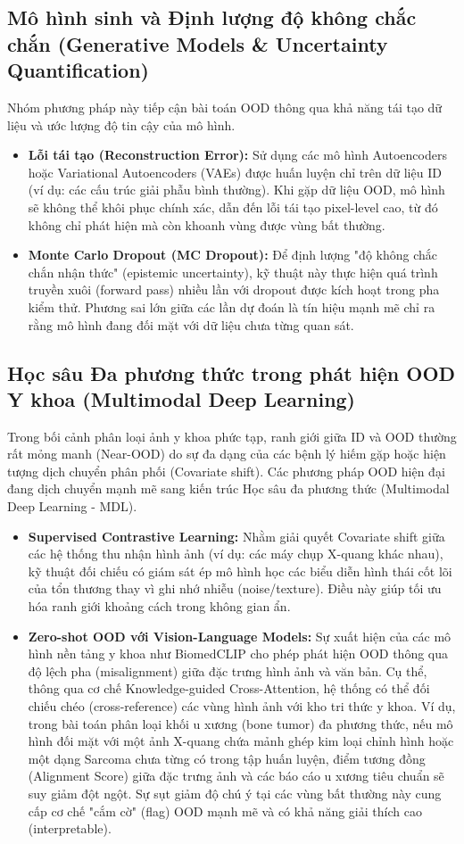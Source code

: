 \subsection{Mô hình sinh và Định lượng độ không chắc chắn (Generative Models \& Uncertainty Quantification)}
Nhóm phương pháp này tiếp cận bài toán OOD thông qua khả năng tái tạo dữ liệu và ước lượng độ tin cậy của mô hình.
\begin{itemize}
  \item \textbf{Lỗi tái tạo (Reconstruction Error):} Sử dụng các mô hình Autoencoders hoặc Variational Autoencoders (VAEs) 
  được huấn luyện chỉ trên dữ liệu ID (ví dụ: các cấu trúc giải phẫu bình thường). 
  Khi gặp dữ liệu OOD, mô hình sẽ không thể khôi phục chính xác, dẫn đến lỗi tái tạo pixel-level cao, 
  từ đó không chỉ phát hiện mà còn khoanh vùng được vùng bất thường.\item \textbf{Monte Carlo Dropout (MC Dropout):} 
  Để định lượng "độ không chắc chắn nhận thức" (epistemic uncertainty), kỹ thuật này thực hiện quá trình truyền xuôi (forward pass) 
  nhiều lần với dropout được kích hoạt trong pha kiểm thử. Phương sai lớn giữa các lần dự đoán là tín hiệu mạnh mẽ chỉ ra rằng mô 
  hình đang đối mặt với dữ liệu chưa từng quan sát.
\end{itemize}

\subsection{Học sâu Đa phương thức trong phát hiện OOD Y khoa (Multimodal Deep Learning)}
Trong bối cảnh phân loại ảnh y khoa phức tạp, ranh giới giữa ID và OOD thường rất mỏng manh (Near-OOD) 
do sự đa dạng của các bệnh lý hiếm gặp hoặc hiện tượng dịch chuyển phân phối (Covariate shift). 
Các phương pháp OOD hiện đại đang dịch chuyển mạnh mẽ sang kiến trúc Học sâu đa phương thức (Multimodal Deep Learning - MDL).
\begin{itemize}
  \item \textbf{Supervised Contrastive Learning:} Nhằm giải quyết Covariate shift giữa các hệ thống thu nhận hình ảnh 
  (ví dụ: các máy chụp X-quang khác nhau), kỹ thuật đối chiếu có giám sát ép mô hình học các biểu diễn hình thái cốt lõi của 
  tổn thương thay vì ghi nhớ nhiễu (noise/texture). Điều này giúp tối ưu hóa ranh giới khoảng cách trong không gian ẩn.
  \item \textbf{Zero-shot OOD với Vision-Language Models:} Sự xuất hiện của các mô hình nền tảng y khoa như BiomedCLIP 
  cho phép phát hiện OOD thông qua độ lệch pha (misalignment) giữa đặc trưng hình ảnh và văn bản. 
  Cụ thể, thông qua cơ chế Knowledge-guided Cross-Attention, hệ thống có thể đối chiếu chéo (cross-reference) 
  các vùng hình ảnh với kho tri thức y khoa. Ví dụ, trong bài toán phân loại khối u xương (bone tumor) đa phương thức, 
  nếu mô hình đối mặt với một ảnh X-quang chứa mảnh ghép kim loại chỉnh hình hoặc một dạng Sarcoma chưa từng có trong tập huấn luyện, 
  điểm tương đồng (Alignment Score) giữa đặc trưng ảnh và các báo cáo u xương tiêu chuẩn sẽ suy giảm đột ngột. 
  Sự sụt giảm độ chú ý tại các vùng bất thường này cung cấp cơ chế "cắm cờ" (flag) OOD mạnh mẽ và có khả năng giải thích cao 
  (interpretable).
\end{itemize}

